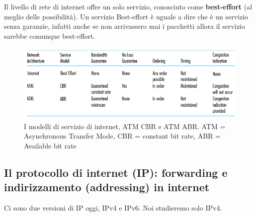 \documentclass[11pt,a4paper]{article}
\begin{document}
Il livello di rete di internet offre un solo servizio, conosciuto come \textbf{best-effort} (al meglio delle possibilità). Un servizio Best-effort è uguale a dire che è un servizio senza garanzie, infatti anche se non arrivassero mai i pacchetti allora il servizio sarebbe comunque best-effort.
\begin{figure}
	\includegraphics[scale=0.6]{img/051.png}
	\caption{I modelli di servizio di internet, ATM CBR e ATM ABR. ATM = Asynchronous Transfer Mode, CBR = constant bit rate, ABR = Available bit rate}
\end{figure}

\subsection{Il protocollo di internet (IP): forwarding e indirizzamento (addressing) in internet}
Ci sono due versioni di IP oggi, IPv4 e IPv6. Noi studieremo solo IPv4.
\end{document}
